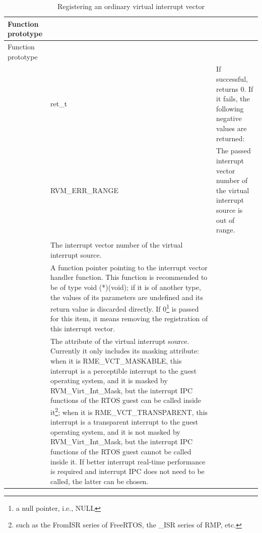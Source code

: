 \begin{xltabular}{\textwidth}{@{}>{\hsize\raggedright\arraybackslash}X>{\hsize\raggedright\arraybackslash}X>{\hsize\raggedright\arraybackslash}X@{}}
\caption{Registering an ordinary virtual interrupt vector}\label{tab:4-23}\\
\toprule
Function prototype & \tabularnewline
\endfirsthead
\toprule
Function prototype & \tabularnewline
\midrule
\endhead
\bottomrule
\endlastfoot
{} & ret\_\allowbreak{}t & If successful, returns 0. If it fails, the following negative values are returned:\tabularnewline
& RVM\_\allowbreak{}ERR\_\allowbreak{}RANGE & The passed interrupt vector number of the virtual interrupt source is out of range.\tabularnewline
{}\tabularnewline
{} & The interrupt vector number of the virtual interrupt source.\tabularnewline
{} & A function pointer pointing to the interrupt vector handler function. This function is recommended to be of type void (*)(void); if it is of another type, the values of its parameters are undefined and its return value is discarded directly. If 0\footnote{a null pointer, i.e., NULL} is passed for this item, it means removing the registration of this interrupt vector.\tabularnewline
{} & The attribute of the virtual interrupt source. Currently it only includes its masking attribute: when it is RME\_VCT\_MASKABLE, this interrupt is a perceptible interrupt to the guest operating system, and it is masked by RVM\_Virt\_Int\_Mask, but the interrupt IPC functions of the RTOS guest can be called inside it\footnote{such as the FromISR series of FreeRTOS, the \_ISR series of RMP, etc.}; when it is RME\_VCT\_TRANSPARENT, this interrupt is a transparent interrupt to the guest operating system, and it is not masked by RVM\_Virt\_Int\_Mask, but the interrupt IPC functions of the RTOS guest cannot be called inside it. If better interrupt real-time performance is required and interrupt IPC does not need to be called, the latter can be chosen.\tabularnewline
\end{xltabular}

